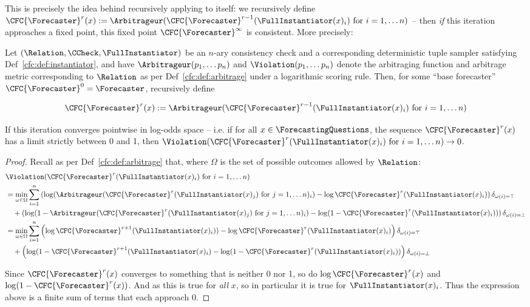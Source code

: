 This is precisely the idea behind recursively applying \CFCaster{} to itself: we recursively define $\CFC{\Forecaster}^r(x):=\Arbitrageur(\CFC{\Forecaster}^{r-1}(\FullInstantiator(x)_i)\text{ for }i=1,\dots n)$ -- then \emph{if} this iteration approaches a fixed point, this fixed point $\CFC{\Forecaster}^\infty$ is consistent. More precisely:

\begin{theorem}
\label{cfc:thm:recursive}
Let $\checktriple$ be an $n$-ary consistency check and a corresponding deterministic tuple sampler satisfying Def~\ref{cfc:def:instantiator}, and have $\Arbitrageur(p_1,\dots p_n)$ and $\Violation(p_1,\dots p_n)$ denote the arbitraging function and arbitrage metric corresponding to $\Relation$ as per Def~\ref{cfc:def:arbitrage} under a logarithmic scoring rule. Then, for some ``base forecaster'' $\CFC{\Forecaster}^0=\Forecaster$, recursively define

\begin{equation*}
\CFC{\Forecaster}^r(x):=\Arbitrageur(\CFC{\Forecaster}^{r-1}(\FullInstantiator(x)_i)\text{ for }i=1,\dots n)
\end{equation*}

If this iteration converges pointwise in log-odds space -- i.e. if for all $x\in\ForecastingQuestions$, the sequence $\CFC{\Forecaster}^r(x)$ has a limit strictly between 0 and 1, then $\Violation(\CFC{\Forecaster}^r(\FullInstantiator(x)_i)\text{ for }i=1,\dots n)\to 0$.
\end{theorem}
\begin{proof}
Recall as per Def~\ref{cfc:def:arbitrage} that, where $\Omega$ is the set of possible outcomes allowed by $\Relation$:
\begin{align*}
&\Violation(\CFC{\Forecaster}^r(\FullInstantiator(x)_i)\text{ for }i=1,\dots n)\\
&=\min_{\omega\in\Omega}\sum_{i=1}^n \left(\log(\Arbitrageur(\CFC{\Forecaster}^r(\FullInstantiator(x)_j)\text{ for }j=1,\dots n)_i)-\log\CFC{\Forecaster}^r(\FullInstantiator(x)_i)\right)\delta_{\omega(i)=\top}\\
&\quad+
\left(\log(1-\Arbitrageur(\CFC{\Forecaster}^r(\FullInstantiator(x)_j)\text{ for }j=1,\dots n)_i)-\log(1-\CFC{\Forecaster}^r(\FullInstantiator(x)_i))\right)\delta_{\omega(i)=\bot}\\
&=\min_{\omega\in\Omega}\sum_{i=1}^n \left(\log\CFC{\Forecaster}^{r+1}(\FullInstantiator(x)_i))-\log\CFC{\Forecaster}^r(\FullInstantiator(x)_i)\right)\delta_{\omega(i)=\top}\\
&\quad+
\left(\log(1-\CFC{\Forecaster}^{r+1}(\FullInstantiator(x)_i)-\log(1-\CFC{\Forecaster}^r(\FullInstantiator(x)_i))\right)\delta_{\omega(i)=\bot}
\end{align*}

Since $\CFC{\Forecaster}^r(x)$ converges to something that is neither 0 nor 1, so do $\log\CFC{\Forecaster}^r(x)$ and $\log(1-\CFC{\Forecaster}^r(x))$. And as this is true for \emph{all} $x$, so in particular it is true for $\FullInstantiator(x)_i$. Thus the expression above is a finite sum of terms that each approach 0.
\end{proof}

